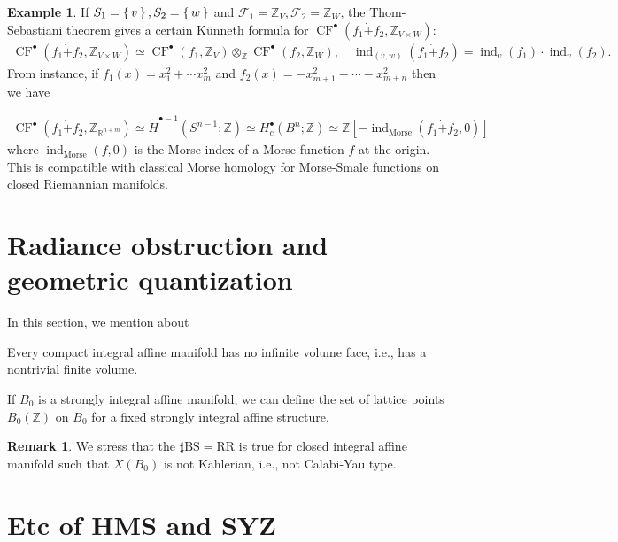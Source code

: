 \documentclass[a4paper,dvipdfmx,reqno,12pt]{amsart}
\theoremstyle{definition}
\newtheorem{Eg}[Thm]{Example}
\newtheorem{Rmk}[Thm]{Remark}
\newcommand{\R}{\mathbb{R}}%
\newcommand{\Z}{\mathbb{Z}}%
\newcommand{\mcal}[1]{\mathcal{#1}}%
\newcommand{\opn}[1]{\operatorname{#1}}
\numberwithin{equation}{section}
\begin{document}
\begin{Eg}
  If $S_1=\set{v},S_2=\set{w}$ and $\mcal{F}_1=\Z_V, \mcal{F}_2=\Z_{W}$,
  the Thom-Sebastiani theorem gives
  a certain K\"unneth formula for
  $\opn{CF}^{\bullet}(f_1\dot{+}f_2,\Z_{V\times W})$:
  \begin{align}
    \opn{CF}^{\bullet}(f_1\dot{+}f_2,\Z_{V\times W})
    \simeq \opn{CF}^{\bullet}(f_1,\Z_{V})
    \otimes_{\Z} \opn{CF}^{\bullet}(f_2,\Z_{W}), \quad
    \opn{ind}_{(v,w)}(f_1\dot{+}f_2)=\opn{ind}_v(f_1)\cdot \opn{ind}_v(f_2).
  \end{align}
  From instance, if $f_1(x)=x_1^{2}+\cdots x_{m}^{2}$
  and $f_2(x)=-x_{m+1}^{2}-\cdots - x_{m+n}^{2}$ then we have

  \begin{align}
    \opn{CF}^{\bullet}(f_1\dot{+}f_2,\Z_{\R^{n+m}})
    \simeq \tilde{H}^{\bullet-1}(S^{n-1};\Z)
\simeq H^{\bullet}_c(B^{n};\Z)
    \simeq \Z[-\opn{ind}_{\mathrm{Morse}}(f_1\dot{+}f_2,0)]
  \end{align}
  where $\opn{ind}_{\mathrm{Morse}}(f,0)$ is the Morse index
  of a Morse function $f$ at the origin.
This is compatible with classical Morse homology for Morse-Smale functions
on closed Riemannian manifolds.
\end{Eg}


\appendix

\section{Radiance obstruction and geometric quantization}

In this section, we mention about 

Every compact integral affine manifold has no infinite volume face,
 i.e., has a nontrivial finite volume.

If $B_0$ is a strongly integral affine manifold,
we can define the set of lattice points $B_0(\Z)$ 
on $B_0$ for a fixed strongly integral affine structure.

\begin{Rmk}
  We stress that the $\sharp \mathrm{BS}=\mathrm{RR}$ is true for closed integral affine manifold such that $X(B_0)$ is not K\"ahlerian, i.e., not Calabi-Yau type.
\end{Rmk}

\section{Etc of HMS and SYZ}
\end{document}
